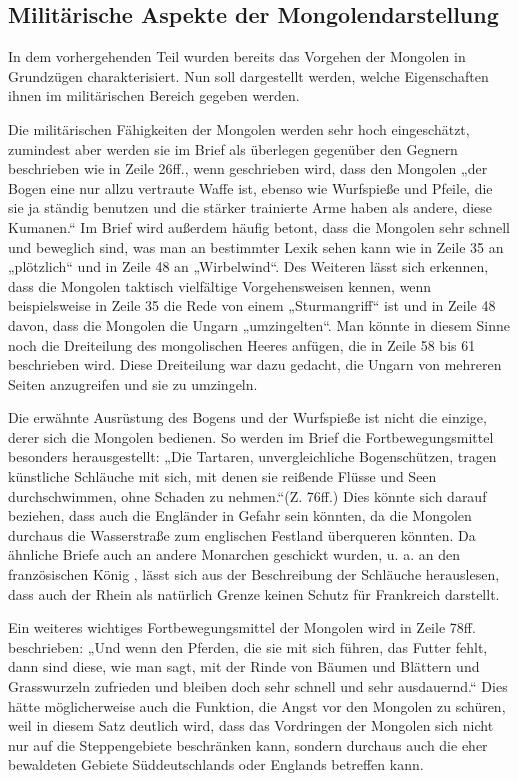 \documentclass[12pt,headsepline,a4paper]{scrartcl}
\begin{document}
\subsection{Militärische Aspekte der Mongolendarstellung}
In dem vorhergehenden Teil wurden bereits das Vorgehen der Mongolen in
Grundzügen charakterisiert. Nun soll dargestellt werden, welche Eigenschaften ihnen
im militärischen Bereich gegeben werden.

Die militärischen Fähigkeiten der Mongolen werden sehr hoch eingeschätzt,
zumindest aber werden sie im Brief als überlegen gegenüber den Gegnern beschrieben
wie in Zeile 26ff., wenn geschrieben wird, dass den Mongolen „der Bogen eine nur
allzu vertraute Waffe ist, ebenso wie Wurfspieße und Pfeile, die sie ja ständig benutzen
und die stärker trainierte Arme haben als andere, diese Kumanen.“ Im Brief wird
außerdem häufig betont, dass die Mongolen sehr schnell und beweglich sind, was man
an bestimmter Lexik sehen kann wie in Zeile 35 an „plötzlich“ und in Zeile 48 an
„Wirbelwind“. Des Weiteren lässt sich erkennen, dass die Mongolen taktisch vielfältige
Vorgehensweisen kennen, wenn beispielsweise in Zeile 35 die Rede von einem
„Sturmangriff“ ist und in Zeile 48 davon, dass die Mongolen die Ungarn „umzingelten“.
Man könnte in diesem Sinne noch die Dreiteilung des mongolischen Heeres anfügen,
die in Zeile 58 bis 61 beschrieben wird. Diese Dreiteilung war dazu gedacht, die Ungarn
von mehreren Seiten anzugreifen und sie zu umzingeln.

Die erwähnte Ausrüstung des Bogens und der Wurfspieße ist nicht die einzige, derer
sich die Mongolen bedienen. So werden im Brief die Fortbewegungsmittel besonders
herausgestellt: „Die Tartaren, unvergleichliche Bogenschützen, tragen künstliche
Schläuche mit sich, mit denen sie reißende Flüsse und Seen durchschwimmen, ohne
Schaden zu nehmen.“(Z. 76ff.) Dies könnte sich darauf beziehen, dass auch die
Engländer in Gefahr sein könnten, da die Mongolen durchaus die Wasserstraße zum
englischen Festland überqueren könnten. Da ähnliche Briefe auch an andere Monarchen
geschickt wurden, u. a. an den französischen König\autocite[519]{heinisch1977} , lässt sich aus der Beschreibung der
Schläuche herauslesen, dass auch der Rhein als natürlich Grenze keinen Schutz für
Frankreich darstellt.

Ein weiteres wichtiges Fortbewegungsmittel der Mongolen wird in Zeile 78ff.
beschrieben: „Und wenn den Pferden, die sie mit sich führen, das Futter fehlt, dann sind
diese, wie man sagt, mit der Rinde von Bäumen und Blättern und Grasswurzeln
zufrieden und bleiben doch sehr schnell und sehr ausdauernd.“ Dies hätte
möglicherweise auch die Funktion, die Angst vor den Mongolen zu schüren, weil in
diesem Satz deutlich wird, dass das Vordringen der Mongolen sich nicht nur auf die
Steppengebiete beschränken kann, sondern durchaus auch die eher bewaldeten Gebiete
Süddeutschlands oder Englands betreffen kann.
\end{document}
